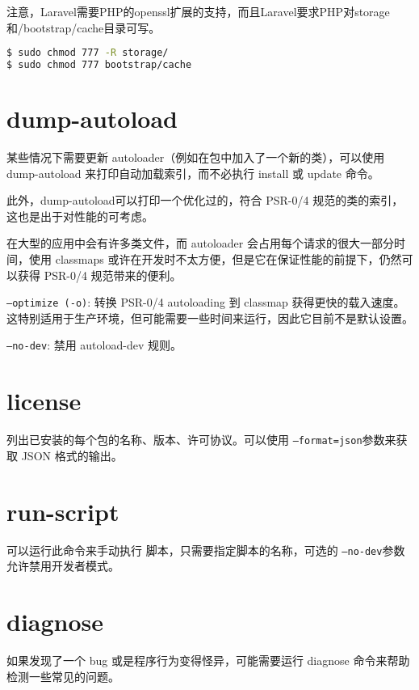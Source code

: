 注意，Laravel需要PHP的openssl扩展的支持，而且Laravel要求PHP对storage和/bootstrap/cache目录可写。

\begin{lstlisting}[language=bash]
$ sudo chmod 777 -R storage/
$ sudo chmod 777 bootstrap/cache
\end{lstlisting}

\section{dump-autoload}

某些情况下需要更新 autoloader（例如在包中加入了一个新的类），可以使用 dump-autoload 来打印自动加载索引，而不必执行 install 或 update 命令。

此外，dump-autoload可以打印一个优化过的，符合 PSR-0/4 规范的类的索引，这也是出于对性能的可考虑。

在大型的应用中会有许多类文件，而 autoloader 会占用每个请求的很大一部分时间，使用 classmaps 或许在开发时不太方便，但是它在保证性能的前提下，仍然可以获得 PSR-0/4 规范带来的便利。

\begin{compactitem}
\item \texttt{--optimize (-o)}: 转换 PSR-0/4 autoloading 到 classmap 获得更快的载入速度。这特别适用于生产环境，但可能需要一些时间来运行，因此它目前不是默认设置。
\item \texttt{--no-dev}: 禁用 autoload-dev 规则。
\end{compactitem}




\section{license}

列出已安装的每个包的名称、版本、许可协议。可以使用 \texttt{--format=json}参数来获取 JSON 格式的输出。

\section{run-script}

可以运行此命令来手动执行 脚本，只需要指定脚本的名称，可选的 \texttt{--no-dev}参数允许禁用开发者模式。

\section{diagnose}

如果发现了一个 bug 或是程序行为变得怪异，可能需要运行 diagnose 命令来帮助检测一些常见的问题。

